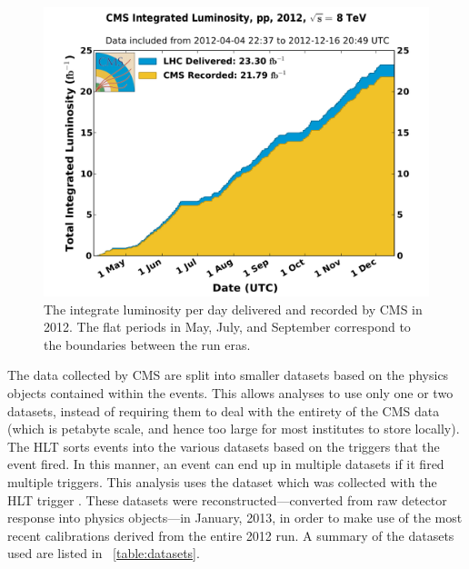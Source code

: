 \begin{figure}[tb]
    \centering
    \includegraphics[width=\textwidth]{figures/2012_lumi.pdf}
    \caption{The integrate luminosity per day delivered and recorded by CMS in
        2012. The flat periods in May, July, and September correspond to the
        boundaries between the run eras.}
    \label{fig:2012_luminosity}
\end{figure}

The data collected by CMS are split into smaller datasets based on the physics
objects contained within the events. This allows analyses to use only one or
two datasets, instead of requiring them to deal with the entirety of the CMS
data (which is petabyte scale, and hence too large for most institutes to store
locally). The HLT sorts events into the various datasets based on the triggers
that the event fired. In this manner, an event can end up in multiple datasets
if it fired multiple triggers. This analysis uses the \SingleElectron dataset
which was collected with the HLT trigger \SingleElectronTrigger. These datasets
were reconstructed---converted from raw detector response into physics
objects---in January, 2013, in order to make use of the most recent
calibrations derived from the entire 2012 run. A summary of the datasets used
are listed in \TAB~\ref{table:datasets}.

